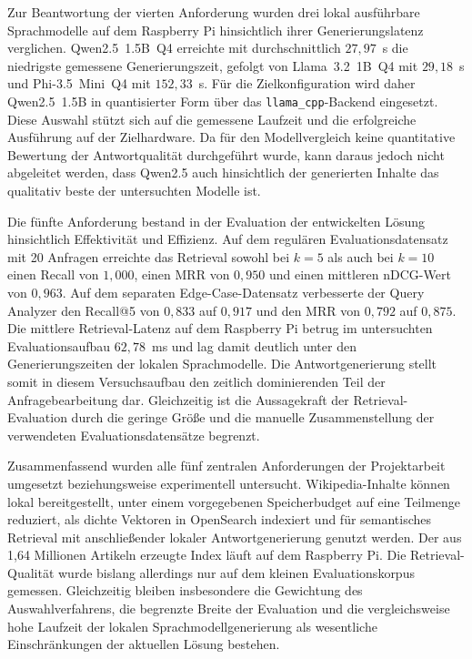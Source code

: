 Zur Beantwortung der vierten Anforderung wurden drei lokal ausführbare
Sprachmodelle auf dem Raspberry Pi hinsichtlich ihrer Generierungslatenz
verglichen. Qwen2.5~1.5B~Q4 erreichte mit durchschnittlich $27{,}97$~s die
niedrigste gemessene Generierungszeit, gefolgt von Llama~3.2~1B~Q4 mit
$29{,}18$~s und Phi-3.5~Mini~Q4 mit $152{,}33$~s. Für die Zielkonfiguration
wird daher Qwen2.5~1.5B in quantisierter Form über das
\texttt{llama\_cpp}-Backend eingesetzt. Diese Auswahl stützt sich auf die
gemessene Laufzeit und die erfolgreiche Ausführung auf der Zielhardware. Da
für den Modellvergleich keine quantitative Bewertung der Antwortqualität
durchgeführt wurde, kann daraus jedoch nicht abgeleitet werden, dass Qwen2.5
auch hinsichtlich der generierten Inhalte das qualitativ beste der
untersuchten Modelle ist.

Die fünfte Anforderung bestand in der Evaluation der entwickelten Lösung
hinsichtlich Effektivität und Effizienz. Auf dem regulären
Evaluationsdatensatz mit 20 Anfragen erreichte das Retrieval sowohl bei
$k=5$ als auch bei $k=10$ einen Recall von $1{,}000$, einen MRR von
$0{,}950$ und einen mittleren nDCG-Wert von $0{,}963$. Auf dem separaten
Edge-Case-Datensatz verbesserte der Query Analyzer den Recall@5 von
$0{,}833$ auf $0{,}917$ und den MRR von $0{,}792$ auf $0{,}875$. Die
mittlere Retrieval-Latenz auf dem Raspberry Pi betrug im untersuchten
Evaluationsaufbau $62{,}78$~ms und lag damit deutlich unter den
Generierungszeiten der lokalen Sprachmodelle. Die Antwortgenerierung stellt
somit in diesem Versuchsaufbau den zeitlich dominierenden Teil der
Anfragebearbeitung dar. Gleichzeitig ist die Aussagekraft der
Retrieval-Evaluation durch die geringe Größe und die manuelle Zusammenstellung
der verwendeten Evaluationsdatensätze begrenzt.

Zusammenfassend wurden alle fünf zentralen Anforderungen der Projektarbeit
umgesetzt beziehungsweise experimentell untersucht. Wikipedia-Inhalte können
lokal bereitgestellt, unter einem vorgegebenen Speicherbudget auf eine
Teilmenge reduziert, als dichte Vektoren in OpenSearch indexiert und für
semantisches Retrieval mit anschließender lokaler Antwortgenerierung genutzt
werden. Der aus 1,64 Millionen Artikeln erzeugte Index läuft auf dem Raspberry
Pi. Die Retrieval-Qualität wurde bislang allerdings nur auf dem kleinen
Evaluationskorpus gemessen. Gleichzeitig bleiben insbesondere
die Gewichtung des Auswahlverfahrens, die begrenzte Breite der Evaluation und
die vergleichsweise hohe Laufzeit der lokalen Sprachmodellgenerierung als
wesentliche Einschränkungen der aktuellen Lösung bestehen.

